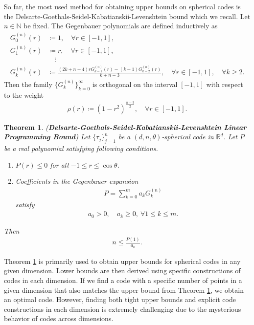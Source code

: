 \documentclass{amsart}
\newtheorem{theorem}{Theorem}[section]
\begin{document}
 So far, the most used method for obtaining upper bounds on spherical codes is the Delsarte-Goethals-Seidel-Kabatianskii-Levenshtein
bound which we recall. Let $n \in \mathbb{N}$ be fixed. The Gegenbauer polynomials are defined inductively as 
\begin{align*}
	G_0^{(n)}(r)&\coloneqq1,\quad \forall r \in [-1,1],\\
	G_1^{(n)}(r)&\coloneqq r,\quad \forall r \in [-1,1],\\
	&\quad\vdots\\
	G_k^{(n)}(r)&\coloneqq\frac{(2k+n-4)rG_{k-1}^{(n)}(r)-(k-1)	G_{k-2}^{(n)}(r)}{k+n-3}, \quad \forall r \in [-1,1], \quad \forall k \geq 2.
\end{align*}
Then the family $\{G_k^{(n)}\}_{k=0}^\infty$ is orthogonal on the interval $[-1,1] $ with respect to the weight 
\begin{align*}
	\rho(r)\coloneqq (1-r^2)^\frac{n-3}{2}, \quad \forall r \in [-1,1].
\end{align*}
\begin{theorem} \cite{DELSARTEGOETHALSSEIDEL, ERICSONZINOVIEV} (\textbf{Delsarte-Goethals-Seidel-Kabatianskii-Levenshtein Linear Programming Bound}) \label{DGS}
	Let $\{\tau_j\}_{j=1}^n$  be a  $(d,n,\theta )$-spherical code in $\mathbb{R}^d$. 
	Let $P$ be a real polynomial satisfying following conditions.
	\begin{enumerate}[\upshape(i)]
		\item $P(r)\leq 0$ for all $-1\leq r\leq \cos \theta$.
		\item Coefficients in the  Gegenbauer expansion 
		\begin{align*}
			P=\sum_{k=0}^{m}a_kG_k^{(n)}
		\end{align*}
	satisfy 
	\begin{align*}
a_0>0, \quad a_k\geq 0, ~\forall 1\leq k \leq m.
	\end{align*}
	\end{enumerate}
Then
\begin{align*}
	n \leq \frac{P(1)}{a_0}.
\end{align*}
\end{theorem}
Theorem \ref{DGS} is primarily used to obtain upper bounds for spherical codes in any given dimension. Lower bounds are then derived using specific constructions of codes in each dimension. If we find a code with a specific number of points in a given dimension that also matches the upper bound from Theorem \ref{DGS}, we obtain an optimal code. However, finding both tight upper bounds and explicit code constructions in each dimension is extremely challenging due to the mysterious behavior of codes across dimensions.
\end{document}
